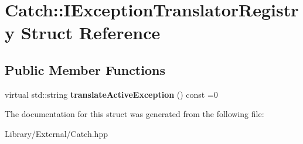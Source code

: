 \hypertarget{struct_catch_1_1_i_exception_translator_registry}{}\section{Catch\+:\+:I\+Exception\+Translator\+Registry Struct Reference}
\label{struct_catch_1_1_i_exception_translator_registry}
\subsection*{Public Member Functions}
\begin{DoxyCompactItemize}
\item 
\hypertarget{struct_catch_1_1_i_exception_translator_registry_af76ae8c331a17f2a94c9720bc0d686bb}{}virtual std\+::string {\bfseries translate\+Active\+Exception} () const =0\label{struct_catch_1_1_i_exception_translator_registry_af76ae8c331a17f2a94c9720bc0d686bb}

\end{DoxyCompactItemize}


The documentation for this struct was generated from the following file\+:\begin{DoxyCompactItemize}
\item 
Library/\+External/Catch.\+hpp\end{DoxyCompactItemize}
